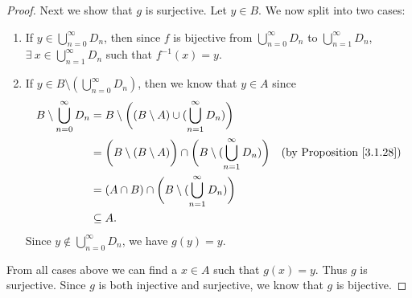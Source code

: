 \begin{proof}
    Next we show that \(g\) is surjective.
    Let \(y \in B\).
    We now split into two cases:
    \begin{enumerate}
        \item If \(y \in \bigcup_{n = 0}^\infty D_n\), then since \(f\) is bijective from \(\bigcup_{n = 0}^\infty D_n\) to \(\bigcup_{n = 1}^\infty D_n\), \(\exists\ x \in \bigcup_{n = 1}^\infty D_n\) such that \(f^{-1}(x) = y\).
        \item If \(y \in B \setminus (\bigcup_{n = 0}^\infty D_n)\), then we know that \(y \in A\) since
              \begin{align*}
                  B \setminus \bigcup_{n = 0}^\infty D_n & = B \setminus \bigg((B \setminus A) \cup (\bigcup_{n = 1}^\infty D_n)\bigg)                                                                \\
                                                         & = \bigg(B \setminus (B \setminus A)\bigg) \cap \bigg(B \setminus (\bigcup_{n = 1}^\infty D_n)\bigg) & \text{(by Proposition \ref{3.1.28})} \\
                                                         & = (A \cap B) \cap \bigg(B \setminus (\bigcup_{n = 1}^\infty D_n)\bigg)                                                                     \\
                                                         & \subseteq A.
              \end{align*}
              Since \(y \notin \bigcup_{n = 0}^\infty D_n\), we have \(g(y) = y\).
    \end{enumerate}
    From all cases above we can find a \(x \in A\) such that \(g(x) = y\).
    Thus \(g\) is surjective.
    Since \(g\) is both injective and surjective, we know that \(g\) is bijective.
\end{proof}